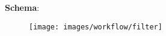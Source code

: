 \documentclass{article}
\begin{document}
	\textbf{Schema}:
	~\begin{figure}[!h]
		\centering
		\texttt{[image: images/workflow/filter]}
	\end{figure}
	
	\FloatBarrier
	


	








\end{document}
